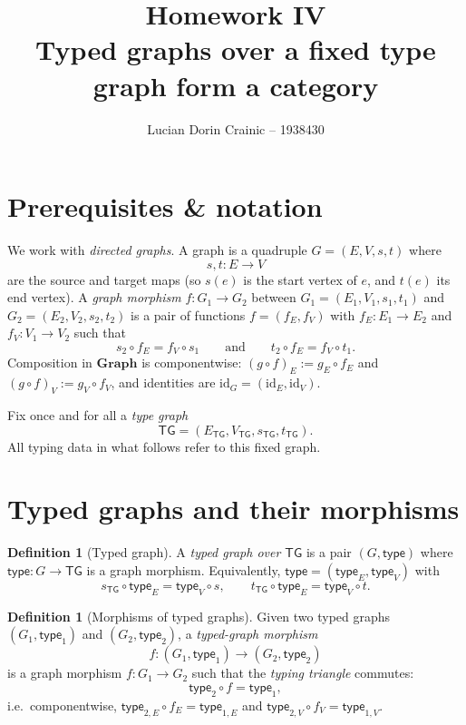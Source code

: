 \documentclass[11pt]{article}
\title{Homework IV\\[0.4em]\large Typed graphs over a fixed type graph form a category}
\author{Lucian Dorin Crainic -- 1938430}
\date{}
\theoremstyle{definition}
\newtheorem{definition}[theorem]{Definition}
\newcommand{\cat}[1]{\mathbf{#1}}
\newcommand{\Graph}{\cat{Graph}}
\newcommand{\id}{\mathrm{id}}
\begin{document}
\maketitle
\vspace{-1.25em}

\section{Prerequisites \& notation}

We work with \emph{directed graphs}. A graph is a quadruple $G=(E,V,s,t)$ where
\[
  s,t: E \longrightarrow V
\]
are the source and target maps (so $s(e)$ is the start vertex of $e$, and $t(e)$ its end vertex).
A \emph{graph morphism} $f:G_1\to G_2$ between $G_1=(E_1,V_1,s_1,t_1)$ and $G_2=(E_2,V_2,s_2,t_2)$
is a pair of functions $f=(f_E,f_V)$ with $f_E:E_1\to E_2$ and $f_V:V_1\to V_2$ such that
\[
  s_2\circ f_E = f_V\circ s_1
  \qquad\text{and}\qquad
  t_2\circ f_E = f_V\circ t_1.
\]
Composition in $\Graph$ is componentwise:
$(g\circ f)_E := g_E\circ f_E$ and $(g\circ f)_V := g_V\circ f_V$, and identities are
$\id_G=(\id_{E},\id_{V})$.

\smallskip
Fix once and for all a \emph{type graph}
\[
  \mathsf{TG} = (E_{\mathsf{TG}},V_{\mathsf{TG}},s_{\mathsf{TG}},t_{\mathsf{TG}}).
\]
All typing data in what follows refer to this fixed graph.

\section{Typed graphs and their morphisms}

\begin{definition}[Typed graph]\label{def:typed-graph}
A \emph{typed graph over $\mathsf{TG}$} is a pair $(G,\mathsf{type})$ where
$\mathsf{type}:G\to \mathsf{TG}$ is a graph morphism.
Equivalently, $\mathsf{type}=(\mathsf{type}_E,\mathsf{type}_V)$ with
\[
  s_{\mathsf{TG}}\circ \mathsf{type}_E = \mathsf{type}_V\circ s,
  \qquad
  t_{\mathsf{TG}}\circ \mathsf{type}_E = \mathsf{type}_V\circ t.
\]
\end{definition}

\begin{definition}[Morphisms of typed graphs]\label{def:typed-morphism}
Given two typed graphs $(G_1,\mathsf{type}_1)$ and $(G_2,\mathsf{type}_2)$,
a \emph{typed-graph morphism}
\[
  f:(G_1,\mathsf{type}_1)\longrightarrow (G_2,\mathsf{type}_2)
\]
is a graph morphism $f:G_1\to G_2$ such that the \emph{typing triangle} commutes:
\[
  \mathsf{type}_2\circ f = \mathsf{type}_1,
\]
i.e.\ componentwise,
$\mathsf{type}_{2,E}\circ f_E = \mathsf{type}_{1,E}$ and
$\mathsf{type}_{2,V}\circ f_V = \mathsf{type}_{1,V}$.
\end{definition}
\end{document}

